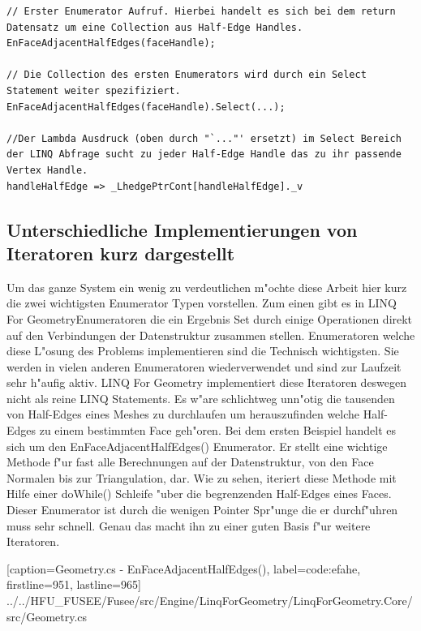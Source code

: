 \documentclass[pagesize, paper=a4, fontsize=12pt,titlepage=true, headings=small, headnosepline, abstractoff, liststotoc, nochapterprefix, plainheadsepline]{scrreprt}
\newcommand{\LFG}{LINQ For Geometry}
\newcommand{\LFGS}{LINQ For Geometry }
\begin{document}
\begin{lstlisting}
// Erster Enumerator Aufruf. Hierbei handelt es sich bei dem return Datensatz um eine Collection aus Half-Edge Handles.
EnFaceAdjacentHalfEdges(faceHandle);

// Die Collection des ersten Enumerators wird durch ein Select Statement weiter spezifiziert.
EnFaceAdjacentHalfEdges(faceHandle).Select(...);

//Der Lambda Ausdruck (oben durch "`..."' ersetzt) im Select Bereich der LINQ Abfrage sucht zu jeder Half-Edge Handle das zu ihr passende Vertex Handle.
handleHalfEdge => _LhedgePtrCont[handleHalfEdge]._v
\end{lstlisting}

		\subsection {Unterschiedliche Implementierungen von Iteratoren kurz dargestellt}
			Um das ganze System ein wenig zu verdeutlichen m"ochte diese Arbeit hier kurz die zwei wichtigsten Enumerator Typen vorstellen. Zum einen gibt es in \LFG Enumeratoren die ein Ergebnis Set durch einige Operationen direkt auf den Verbindungen der Datenstruktur zusammen stellen. Enumeratoren welche diese L"osung des Problems implementieren sind die Technisch wichtigsten. Sie werden in vielen anderen Enumeratoren wiederverwendet und sind zur Laufzeit sehr h"aufig aktiv. \LFGS implementiert diese Iteratoren deswegen nicht als reine LINQ Statements. Es w"are schlichtweg unn"otig die tausenden von Half-Edges eines Meshes zu durchlaufen um herauszufinden welche Half-Edges zu einem bestimmten Face geh"oren. Bei dem ersten Beispiel handelt es sich um den EnFaceAdjacentHalfEdges() Enumerator. Er stellt eine wichtige Methode f"ur fast alle Berechnungen auf der Datenstruktur, von den Face Normalen bis zur Triangulation, dar. Wie zu sehen, iteriert diese Methode mit Hilfe einer do{}While() Schleife "uber die begrenzenden Half-Edges eines Faces. Dieser Enumerator ist durch die wenigen Pointer Spr"unge die er durchf"uhren muss sehr schnell. Genau das macht ihn zu einer guten Basis f"ur weitere Iteratoren.


			[caption={Geometry.cs - EnFaceAdjacentHalfEdges()}, label=code:efahe, firstline=951, lastline=965]
			{../../HFU_FUSEE/Fusee/src/Engine/LinqForGeometry/LinqForGeometry.Core/src/Geometry.cs}
\end{document}
